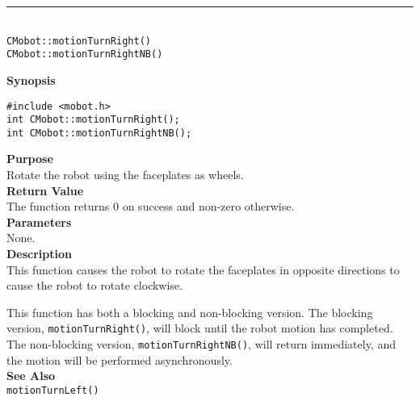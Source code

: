 \noindent
\vspace{5pt}
\rule{4.5in}{0.015in}\\
\noindent
{\LARGE \texttt{CMobot::motionTurnRight()}}\\
{\LARGE \texttt{CMobot::motionTurnRightNB()}}\\
{}

\noindent
{\bf Synopsis}\\
\begin{verbatim}
#include <mobot.h>
int CMobot::motionTurnRight();
int CMobot::motionTurnRightNB();
\end{verbatim}

\noindent
{\bf Purpose}\\
Rotate the robot using the faceplates as wheels.\\

\noindent
{\bf Return Value}\\
The function returns 0 on success and non-zero otherwise.\\

\noindent
{\bf Parameters}\\
None.\\

\noindent
{\bf Description}\\
This function causes the robot to rotate the faceplates in opposite directions
to cause the robot to rotate clockwise.

This function has both a blocking and non-blocking version.
The blocking version, \texttt{motionTurnRight()}, will block until the
robot motion has completed. The non-blocking version, \texttt{motionTurnRightNB()},
will return immediately, and the motion will be performed asynchronously.\\

\noindent
{\bf See Also}\\
\texttt{motionTurnLeft()}

